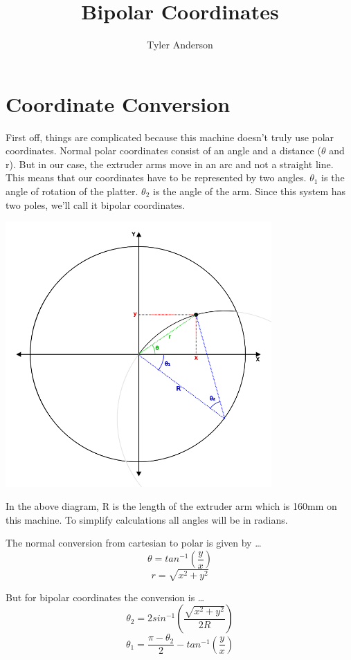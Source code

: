 \documentclass[12pt,letterpaper]{report}
\author{Tyler Anderson}
\title{Bipolar Coordinates}
\begin{document}
\section*{Coordinate Conversion}

First off, things are complicated because this machine doesn't truly use polar coordinates. Normal polar coordinates consist of an angle and a distance ($\theta$ and r). But in our case, the extruder arms move in an arc and not a straight line. This means that our coordinates have to be represented by two angles. $\theta_1$ is the angle of rotation of the platter. $\theta_2$ is the angle of the arm. Since this system has two poles, we'll call it bipolar coordinates. 

\includegraphics[width=4in]{polar.png}

In the above diagram, R is the length of the extruder arm which is 160mm on this machine. To simplify calculations all angles will be in radians.

The normal conversion from cartesian to polar is given by \ldots
\begin{equation}
	\theta = tan^{-1} \left( \dfrac{y}{x} \right)  
\end{equation}
\begin{equation}
	r = \sqrt{x^{2}+y^{2}}
\end{equation}

But for bipolar coordinates the conversion is \ldots
\begin{equation}
	\theta_2 = 2 sin^{-1} \left( \dfrac{\sqrt{x^2+y^2}}{2R} \right)
\end{equation}
\begin{equation}
	\theta_1 = \dfrac{\pi-\theta_2}{2} - tan^{-1} \left( \dfrac{y}{x} \right) 
\end{equation}
\end{document}

